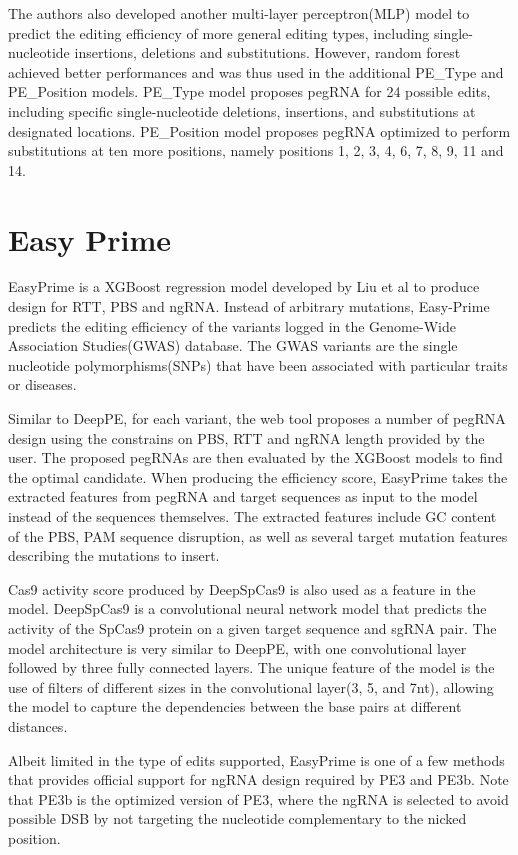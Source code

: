 The authors also developed another multi-layer perceptron(MLP) model to predict the editing efficiency of more general editing types, including single-nucleotide insertions, deletions and substitutions. However, random forest achieved better performances and was thus used in the additional PE\_Type and PE\_Position models. PE\_Type model proposes pegRNA for 24 possible edits, including specific single-nucleotide deletions, insertions, and substitutions at designated locations. PE\_Position model proposes pegRNA optimized to perform substitutions at ten more positions, namely positions 1, 2, 3, 4, 6, 7, 8, 9, 11 and 14.

\section{Easy Prime}

EasyPrime is a XGBoost regression model developed by Liu et al to produce design for RTT, PBS and ngRNA. Instead of arbitrary mutations, Easy-Prime predicts the editing efficiency of the variants logged in the Genome-Wide Association Studies(GWAS) database. The GWAS variants are the single nucleotide polymorphisms(SNPs) that have been associated with particular traits or diseases.

Similar to DeepPE, for each variant, the web tool proposes a number of pegRNA design using the constrains on PBS, RTT and ngRNA length provided by the user. The proposed pegRNAs are then evaluated by the XGBoost models to find the optimal candidate. When producing the efficiency score, EasyPrime takes the extracted features from pegRNA and target sequences as input to the model instead of the sequences themselves. The extracted features include GC content of the PBS, PAM sequence disruption, as well as several target mutation features describing the mutations to insert.

Cas9 activity score produced by DeepSpCas9 is also used as a feature in the model. DeepSpCas9 is a convolutional neural network model that predicts the activity of the SpCas9 protein on a given target sequence and sgRNA pair. The model architecture is very similar to DeepPE, with one convolutional layer followed by three fully connected layers. The unique feature of the model is the use of filters of different sizes in the convolutional layer(3, 5, and 7nt), allowing the model to capture the dependencies between the base pairs at different distances\cite{kimSpCas9ActivityPrediction2019}.

Albeit limited in the type of edits supported, EasyPrime is one of a few methods that provides official support for ngRNA design required by PE3 and PE3b. Note that PE3b is the optimized version of PE3, where the ngRNA is selected to avoid possible DSB by not targeting the nucleotide complementary to the nicked position\cite{liudavidr.SearchandreplaceGenomeEditing2019}.

